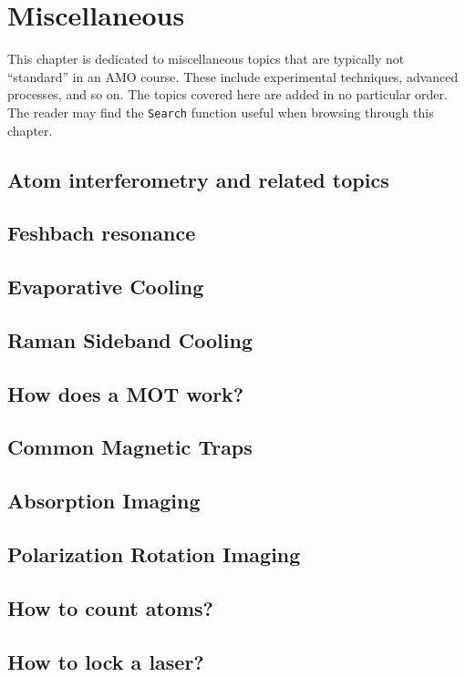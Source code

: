 \documentclass{book}
\theoremstyle{definition}
\begin{document}
\chapter{Miscellaneous}

This chapter is dedicated to miscellaneous topics that are typically not ``standard'' in an AMO course. These include experimental techniques, advanced processes, and so on. The topics covered here are added in no particular order. The reader may find the \texttt{Search} function useful when browsing through this chapter. 

\section{Atom interferometry and related topics}

\section{Feshbach resonance}

\section{Evaporative Cooling}

\section{Raman Sideband Cooling}

\section{How does a MOT work?}

\section{Common Magnetic Traps}

\section{Absorption Imaging}

\section{Polarization Rotation Imaging}

\section{How to count atoms?}

\section{How to lock a laser?}



 




	
	
\end{document}
